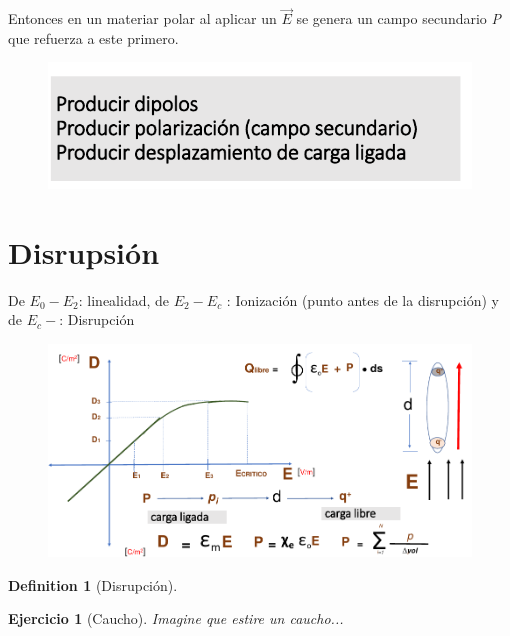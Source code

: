 \documentclass[12pt,letterpaper]{book}
\newtheorem{definition}{Definition}
\newtheorem{exercise}{Ejercicio}[section]
\begin{document}
Entonces en un materiar polar al aplicar un $\vec{E}$ se genera un campo secundario \textit{P} que refuerza a este primero.

\begin{figure}[H]
\centering
\includegraphics[width=1\linewidth]{figures/carFre6.png}
\caption{}
\label{carFre6}
\end{figure}
\vspace{0.2cm}


\section{Disrupsión}
De $E_0-E_2$: linealidad, de $E_2-E_{c}$ : Ionización (punto antes de la disrupción) y de $E_{c}-$: Disrupción
\begin{figure}[H]
\centering
\includegraphics[width=1\linewidth]{figures/dis.png}
\caption{}
\label{}
\end{figure}
\vspace{0.2cm}

\begin{definition}[Disrupción]

\end{definition}


\begin{exercise}[Caucho]
Imagine que estire un caucho...
\end{exercise}
\end{document}
